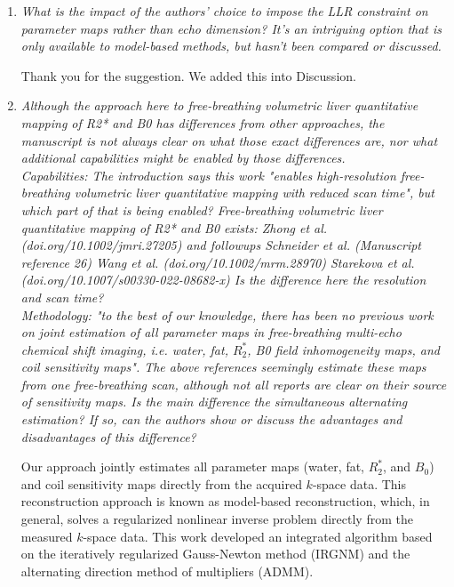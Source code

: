 \documentclass[a4paper,11pt]{report}
\begin{document}
\begin{enumerate}
	\item \textit{What is the impact of the authors' choice to impose the LLR constraint on parameter maps rather than echo dimension? It's an intriguing option that is only available to model-based methods, but hasn't been compared or discussed.}

\hspace{1em} Thank you for the suggestion. We added this into Discussion.

	\item \textit{Although the approach here to free-breathing volumetric liver quantitative mapping of R2* and B0 has differences from other approaches, the manuscript is not always clear on what those exact differences are, nor what additional capabilities might be enabled by those differences. \\
	Capabilities: The introduction says this work "enables high-resolution free-breathing volumetric liver quantitative mapping with reduced scan time", but which part of that is being enabled? Free-breathing volumetric liver quantitative mapping of R2* and B0 exists:
	Zhong et al. (doi.org/10.1002/jmri.27205) and followups
	Schneider et al. (Manuscript reference 26)
	Wang et al. (doi.org/10.1002/mrm.28970)
	Starekova et al. (doi.org/10.1007/s00330-022-08682-x)
	Is the difference here the resolution and scan time?\\
	Methodology: "to the best of our knowledge, there has been no previous work on joint estimation of all parameter maps in free-breathing multi-echo chemical shift imaging, i.e. water, fat, $R_2^*$, B0 field inhomogeneity maps, and coil sensitivity maps". The above references seemingly estimate these maps from one free-breathing scan, although not all reports are clear on their source of sensitivity maps. Is the main difference the simultaneous alternating estimation? If so, can the authors show or discuss the advantages and disadvantages of this difference?}

\hspace{1em} Our approach jointly estimates all parameter maps (water, fat, $R_2^*$, and $B_0$) 
and coil sensitivity maps directly from the acquired $k$-space data. 
This reconstruction approach is known as model-based reconstruction, which, in general, 
solves a regularized nonlinear inverse problem directly from the measured $k$-space data. 
This work developed an integrated algorithm based on 
the iteratively regularized Gauss-Newton method (IRGNM) and 
the alternating direction method of multipliers (ADMM). 


\end{enumerate}
\end{document}

